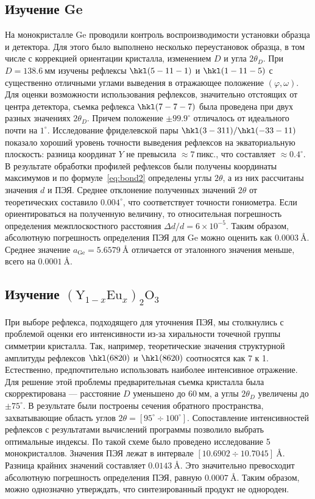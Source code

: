 \documentclass[a4paper,14pt]{extarticle}
\newcommand{\unit}[1]{ \ \text{#1}}
\newcommand{\degree}{^\circ}
\newcommand{\YEu}{${(\text{Y}_{1-x}\text{Eu}_x)}_2\text{O}_3$}
\newcommand{\range}[2]{[#1\div#2]}
\begin{document}
\subsection{Изучение Ge}
На монокристалле Ge проводили контроль воспроизводимости установки образца и детектора.
Для этого было выполнено несколько переустановок образца, в том числе с коррекцией ориентации кристалла, изменением $D$ и угла $2\theta_D$.
При $D = 138.6\unit{мм}$ изучены рефлексы $\hkl(5 -11 -1)$ и $\hkl(1 -11 -5)$ с существенно отличными углами выведения в отражающее положение $(\varphi, \omega)$.
Для оценки возможности использования рефлексов, значительно отстоящих от центра детектора, съемка рефлекса $\hkl(7 -7 -7)$ была проведена при двух разных значениях $2\theta_D$.
Причем положение $\pm 99.9\degree$ отличалось от идеального почти на $1\degree$.
Исследование фриделевской пары $\hkl(3 -3 11)/\hkl(-3 3 -11)$ показало хороший уровень точности выведения рефлексов на экваториальную плоскость: разница координат $Y$ не превысила $\approx 7\unit{пикс.}$, что составляет $\approx 0.4\degree$.
В результате обработки профилей рефлексов были получены координаты максимумов и по формуле~\ref{eq:bond2} определены углы $2\theta$, а из них рассчитаны значения $d$ и ПЭЯ.
Среднее отклонение полученных значений $2\theta$ от теоретических составило $0.004\degree$, что соответствует точности гониометра.
Если ориентироваться на полученную величину, то относительная погрешность определения межплоскостного расстояния $\Delta d / d = 6 \times 10^{-5}$.
Таким образом, абсолютную погрешность определения ПЭЯ для Ge можно оценить как $0.0003\unit{\AA}$.
Среднее значение $a_\text{Ge} = 5.6579\unit{\AA}$ отличается от эталонного значения меньше, всего на $0.0001\unit{\AA}$.
\subsection{Изучение \YEu}
При выборе рефлекса, подходящего для уточнения ПЭЯ, мы столкнулись с проблемой оценки его интенсивности из-за хиральности точечной группы симметрии кристалла.
Так, например, теоретические значения структурной амплитуды рефлексов $\hkl(6 8 20)$ и $\hkl(8 6 20)$ соотносятся как 7 к 1.
Естественно, предпочтительно использовать наиболее интенсивное отражение.
Для решение этой проблемы предварительная съемка кристалла была скорректирована --- расстояние $D$ уменьшено до $60\unit{мм}$, а углы $2\theta_D$ увеличены до $\pm 75\degree$.
В результате были построены сечения обратного пространства, захватывающие область углов $2\theta = \range{95\degree}{100\degree}$.
Сопоставление интенсивностей рефлексов с результатами вычислений программы позволило выбрать оптимальные индексы.
По такой схеме было проведено исследование 5 монокристаллов.
Значения ПЭЯ лежат в интервале $\range{10.6902}{10.7045}\unit{\AA}$.
Разница крайних значений составляет $0.0143\unit{\AA}$.
Это значительно превосходит абсолютную погрешность определения ПЭЯ, равную $0.0007\unit{\AA}$.
Таким образом, можно однозначно утверждать, что синтезированный продукт не однороден.
\end{document}
